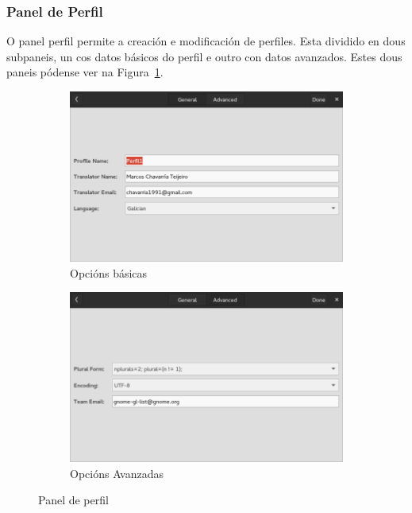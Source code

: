 \subsubsection{Panel de Perfil}
O panel perfil permite a creación e modificación de perfiles. Esta dividido en dous subpaneis, un cos datos básicos do perfil e outro con datos avanzados. Estes dous paneis pódense ver na Figura~\ref{fig:ui:panel:profile}.
\begin{figure}[h!]
  \centering
  \begin{subfigure}[b]{0.5\textwidth}
    \includegraphics[width=\textwidth]{img/panel_pefil_xeral.png}
    \caption{Opcións básicas}
  \end{subfigure}
  \begin{subfigure}[b]{0.5\textwidth}
    \includegraphics[width=\textwidth]{img/panel_perfil_avanzado.png}
    \caption{Opcións Avanzadas}
  \end{subfigure}
    \caption{Panel de perfil}
    \label{fig:ui:panel:profile}
\end{figure}

